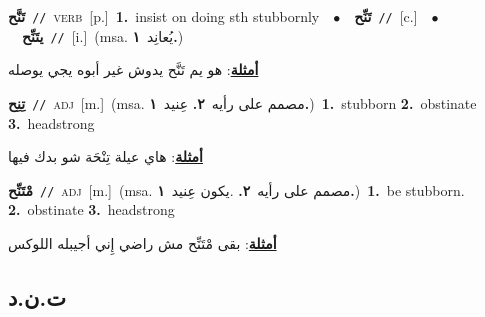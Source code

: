 \documentclass[10pt,a4paper,twoside]{article} %
\begin{document}
\begin{multicols}{2}
{\setlength\topsep{0pt}\textbf{\foreignlanguage{arabic}{تَنَّح}}\ {\color{gray}\texttt{//}\color{black}}\ \textsc{verb}\ [p.]\ \textbf{1.}~insist on doing sth stubbornly\ \ $\bullet$\ \ \setlength\topsep{0pt}\textbf{\foreignlanguage{arabic}{تَنِّح}}\ {\color{gray}\texttt{//}\color{black}}\ [c.]\ \ $\bullet$\ \ \setlength\topsep{0pt}\textbf{\foreignlanguage{arabic}{يتَنِّح}}\ {\color{gray}\texttt{//}\color{black}}\ [i.]\ \color{gray}(msa. \foreignlanguage{arabic}{يُعانِد}~\foreignlanguage{arabic}{\textbf{١.}})\color{black}\  \begin{flushright}\color{gray}\foreignlanguage{arabic}{\textbf{\underline{\foreignlanguage{arabic}{أمثلة}}}: هو يم تَنَّح يدوش غير أبوه يجي يوصله}\end{flushright}\color{black}} \vspace{2mm}

{\setlength\topsep{0pt}\textbf{\foreignlanguage{arabic}{تِنِح}}\ {\color{gray}\texttt{//}\color{black}}\ \textsc{adj}\ [m.]\ \color{gray}(msa. \foreignlanguage{arabic}{مصمم على رأيه}~\foreignlanguage{arabic}{\textbf{٢.}}  \foreignlanguage{arabic}{عِنيد}~\foreignlanguage{arabic}{\textbf{١.}})\color{black}\ \textbf{1.}~stubborn  \textbf{2.}~obstinate  \textbf{3.}~headstrong\  \begin{flushright}\color{gray}\foreignlanguage{arabic}{\textbf{\underline{\foreignlanguage{arabic}{أمثلة}}}: هاي عيلة تِنْحَة شو بدك فيها}\end{flushright}\color{black}} \vspace{2mm}

{\setlength\topsep{0pt}\textbf{\foreignlanguage{arabic}{مْتَنِّح}}\ {\color{gray}\texttt{//}\color{black}}\ \textsc{adj}\ [m.]\ \color{gray}(msa. \foreignlanguage{arabic}{مصمم على رأيه}~\foreignlanguage{arabic}{\textbf{٢.}}  .\foreignlanguage{arabic}{يكون عِنيد}~\foreignlanguage{arabic}{\textbf{١.}})\color{black}\ \textbf{1.}~be stubborn.  \textbf{2.}~obstinate  \textbf{3.}~headstrong\  \begin{flushright}\color{gray}\foreignlanguage{arabic}{\textbf{\underline{\foreignlanguage{arabic}{أمثلة}}}: بقى مْتَنِّح مش راضي إِني أجيبله اللوكس}\end{flushright}\color{black}} \vspace{2mm}

\vspace{-3mm}
\subsection*{\color{blue}\foreignlanguage{arabic}{ت.ن.د}\color{blue}{}} 


\end{multicols}
\end{document}
